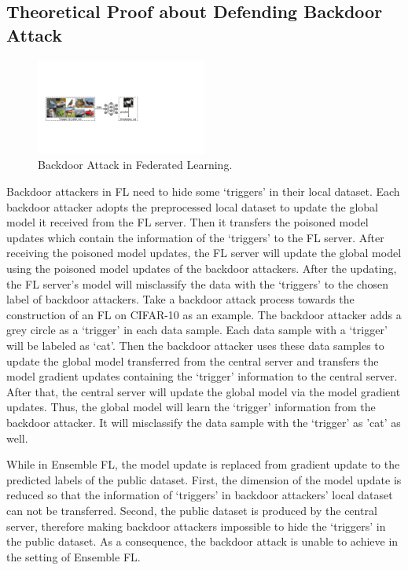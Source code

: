 \documentclass[journal]{IEEEtran}
\begin{document}
\subsection{Theoretical Proof about Defending Backdoor Attack}
\begin{figure}
  \centering
\includegraphics[width=0.5\textwidth]{figures/Figure_backdoor.pdf}
\caption{Backdoor Attack in Federated Learning.}
\label{fig_backdoor}
\end{figure}  
Backdoor attackers in FL need to hide some `triggers' in their local dataset. Each backdoor attacker adopts the preprocessed local dataset to update the global model it received from the FL server. Then it transfers the poisoned model updates which contain the information of the `triggers' to the FL server. After receiving the poisoned model updates, the FL server will update the global model using the poisoned model updates of the backdoor attackers. After the updating, the FL server's model will misclassify the data with the `triggers' to the chosen label of backdoor attackers. Take a backdoor attack process towards the construction of an FL on CIFAR-10 as an example. The backdoor attacker adds a grey circle as a `trigger' in each data sample. Each data sample with a `trigger' will be labeled as `cat'. Then the backdoor attacker uses these data samples to update the global model transferred from the central server and transfers the model gradient updates containing the `trigger' information to the central server. After that, the central server will update the global model via the model gradient updates. Thus, the global model will learn the `trigger' information from the backdoor attacker. It will misclassify the data sample with the `trigger' as 'cat' as well.
\par While in Ensemble FL, the model update is replaced from gradient update to the predicted labels of the public dataset. First, the dimension of the model update is reduced so that the information of `triggers' in backdoor attackers' local dataset can not be transferred. Second, the public dataset is produced by the central server, therefore making backdoor attackers impossible to hide the `triggers' in the public dataset. As a consequence, the backdoor attack is unable to achieve in the setting of Ensemble FL.
\end{document}
